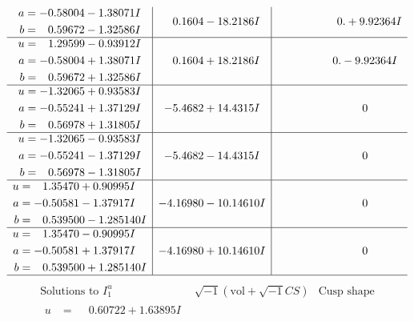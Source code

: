 \documentclass[1p]{elsarticle_modified}
\theoremstyle{definition}
\newcommand{\I}{\sqrt{-1}}
\begin{document}
$$\begin{array}{c|c|c}
\begin{aligned}
a &= -0.58004 - 1.38071 I \\
b &= \phantom{-}0.59672 - 1.32586 I\end{aligned}
 & \phantom{-}0.1604 - 18.2186 I & \phantom{-0.000000 -}0. + 9.92364 I \\ \hline\begin{aligned}
u &= \phantom{-}1.29599 - 0.93912 I \\
a &= -0.58004 + 1.38071 I \\
b &= \phantom{-}0.59672 + 1.32586 I\end{aligned}
 & \phantom{-}0.1604 + 18.2186 I & \phantom{-0.000000 } 0. - 9.92364 I \\ \hline\begin{aligned}
u &= -1.32065 + 0.93583 I \\
a &= -0.55241 + 1.37129 I \\
b &= \phantom{-}0.56978 + 1.31805 I\end{aligned}
 & -5.4682 + 14.4315 I & \phantom{-0.000000 } 0 \\ \hline\begin{aligned}
u &= -1.32065 - 0.93583 I \\
a &= -0.55241 - 1.37129 I \\
b &= \phantom{-}0.56978 - 1.31805 I\end{aligned}
 & -5.4682 - 14.4315 I & \phantom{-0.000000 } 0 \\ \hline\begin{aligned}
u &= \phantom{-}1.35470 + 0.90995 I \\
a &= -0.50581 - 1.37917 I \\
b &= \phantom{-}0.539500 - 1.285140 I\end{aligned}
 & -4.16980 - 10.14610 I & \phantom{-0.000000 } 0 \\ \hline\begin{aligned}
u &= \phantom{-}1.35470 - 0.90995 I \\
a &= -0.50581 + 1.37917 I \\
b &= \phantom{-}0.539500 + 1.285140 I\end{aligned}
 & -4.16980 + 10.14610 I & \phantom{-0.000000 } 0\\
 \hline 
 \end{array}$$\newpage$$\begin{array}{c|c|c}  
\text{Solutions to }I^u_{1}& \I (\text{vol} + \sqrt{-1}CS) & \text{Cusp shape}\\
 \hline 
\begin{aligned}
u &= \phantom{-}0.60722 + 1.63895 I \\

\end{aligned}
\end{array}$$
\end{document}
